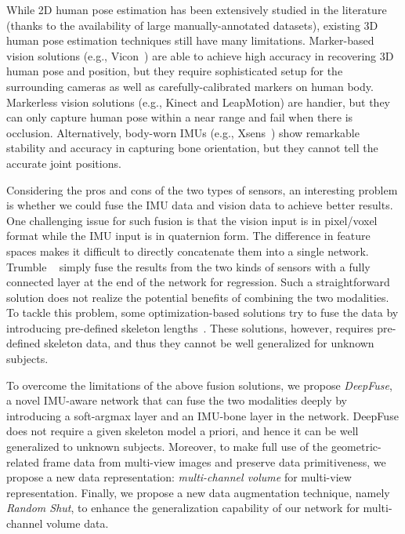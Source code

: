 \documentclass[10pt,twocolumn,letterpaper]{article}
\begin{document}
While 2D human pose estimation has been extensively studied in the literature (thanks to the availability of large manually-annotated datasets), existing 3D human pose estimation techniques still have many limitations. Marker-based vision solutions (e.g., Vicon~\cite{Vicon2014:Online}) are able to achieve high accuracy in recovering 3D human pose and position, but they require sophisticated setup for the surrounding cameras as well as carefully-calibrated markers on human body. 
Markerless vision solutions (e.g., Kinect and LeapMotion) are handier, but they can only capture human pose within a near range and fail when there is occlusion. 
Alternatively, body-worn IMUs (e.g.,  Xsens~\cite{Xsens2009:Online}) show remarkable stability and accuracy in capturing bone orientation, but they cannot tell the accurate joint positions.

Considering the pros and cons of the two types of sensors, an interesting problem is whether we could fuse the IMU data and vision data to achieve better results. One challenging issue for such fusion is that the vision input is in pixel/voxel format while the IMU input is in quaternion form. The difference in feature spaces makes it difficult to directly concatenate them into a single network. Trumble \etal~\cite{trumble2017total} simply fuse the results from the two kinds of sensors with a fully connected layer at the end of the network for regression. Such a straightforward solution does not realize the potential benefits of combining the two modalities. To tackle this problem, some optimization-based solutions try to fuse the data by introducing pre-defined skeleton lengths~\cite{Pons11,malleson2017real,von2018recovering}. These solutions, however, requires pre-defined skeleton data, and thus they cannot be well generalized for unknown subjects.

To overcome the limitations of the above fusion solutions, we propose \emph{DeepFuse}, a novel IMU-aware network that can fuse the two modalities deeply by introducing a soft-argmax layer and an IMU-bone layer in the network. DeepFuse does not require a given skeleton model a priori, and hence it can be well generalized to unknown subjects. Moreover, to make full use of the geometric-related frame data from multi-view images and preserve data primitiveness, we propose a new data representation: \emph{multi-channel volume} for multi-view representation. Finally, we propose a new data augmentation technique, namely \emph{Random Shut}, to enhance the generalization capability of our network for multi-channel volume data. 
\end{document}
